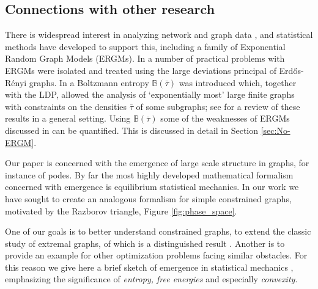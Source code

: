 \documentclass[12pt]{amsart}
\newcommand{\ER}{Erd\H{o}s-R\'enyi}
\newcommand{\B}{\mathbb{B}}
\begin{document}
{

\subsection {\label{Connections} {Connections with other research}}

There is widespread interest in analyzing network and graph data \cite{New}, and statistical methods have developed to support this, including a family of Exponential Random Graph Models (ERGMs). In \cite{CD} a number of practical problems with ERGMs were isolated and treated using the large deviations principal of \ER{} graphs. In \cite{RS1} a Boltzmann entropy $\B(\bar \tau)$ was introduced which, together with the LDP, allowed the analysis of `exponentially most' large finite graphs with constraints on the densities $\bar \tau$ of some subgraphs; see \cite{RS2} for a review of these results in a general setting. Using $\B(\bar \tau)$ some of the weaknesses of ERGMs discussed in \cite{CD} can be quantified. This is discussed in detail in Section \ref{sec:No-ERGM}.

Our paper is concerned with the emergence \cite{Lau} of large scale structure in graphs, for instance of podes. By far the most highly developed mathematical formalism concerned with emergence is equilibrium statistical mechanics. 
In our work we have sought to create an analogous formalism for simple
constrained graphs, motivated by the Razborov triangle, Figure \ref{fig:phase_space}. 

One of our goals is to better understand constrained graphs, to extend the classic study of extremal graphs, of which \cite{PR} is a distinguished result \cite{AlK, Bollobas-Book04}. 
Another is to provide an example for other optimization problems facing similar obstacles. For this reason we give here a brief sketch of emergence in statistical mechanics \cite{Ru, Yeo, Tou}, emphasizing the significance of {\em entropy, free energies} and especially {\em convexity}.

}
\end{document}
